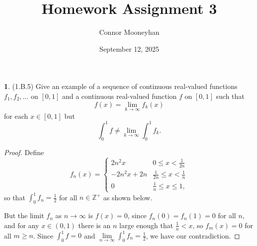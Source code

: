 \documentclass[12pt]{article}
\title{Homework Assignment 3}
\author{Connor Mooneyhan}
\date{September 12, 2025}
\theoremstyle{definition}
\newtheorem{ex}{}
\begin{document}
\maketitle

\begin{ex}
	(1.B.5)
	Give an example of a sequence of continuous real-valued functions $f_1, f_2, \dots$ on $[0, 1]$ and a continuous real-valued function $f$ on $[0,1]$ such that \begin{equation*}
		f(x) = \lim_{k \to \infty} f_k(x)
	\end{equation*}
	for each $x \in [0, 1]$ but \begin{equation*}
		\int_0^1 f \neq \lim_{k \to \infty} \int_0^1 f_k.
	\end{equation*}
\end{ex}
\begin{proof}
	Define \begin{equation*}
		f_n(x) = \begin{cases}
			2n^2x       & 0 \leq x < \frac{1}{2n}           \\
			-2n^2x + 2n & \frac{1}{2n} \leq x < \frac{1}{n} \\
			0           & \frac{1}{n} \leq x \leq 1,
		\end{cases}
	\end{equation*}
	so that $\int_0^1 f_n = \frac{1}{2}$ for all $n \in \mathbb{Z}^+$ as shown below.
	\begin{center}
	\end{center}
	But the limit $f_n$ as $n \to \infty$ is $f(x) = 0$, since $f_n(0) = f_n(1) = 0$ for all $n$, and for any $x \in (0, 1)$ there is an $n$ large enough that $\frac{1}{n} < x$, so $f_m(x) = 0$ for all $m \geq n$.
	Since $\int_0^1 f = 0$ and $\lim\limits_{n \to \infty} \int_0^1 f_n = \frac{1}{2}$, we have our contradiction.
\end{proof}
\end{document}
